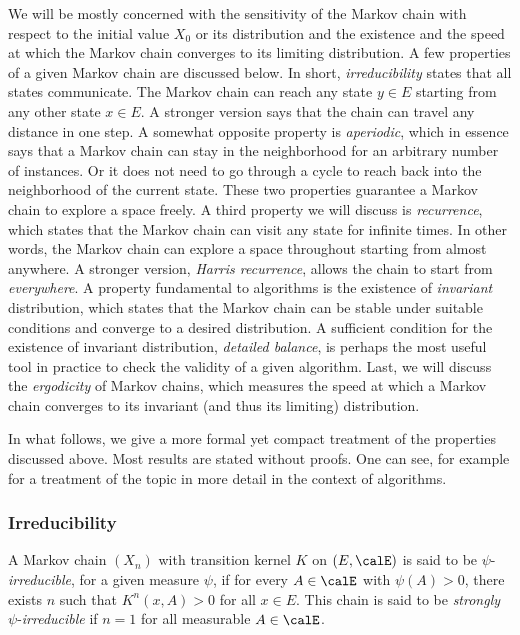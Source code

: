 We will be mostly concerned with the sensitivity of the Markov chain with
respect to the initial value $X_0$ or its distribution and the existence and
the speed at which the Markov chain converges to its limiting distribution. A
few properties of a given Markov chain are discussed below. In short,
\emph{irreducibility} states that all states communicate. The Markov chain can
reach any state $y\in E$ starting from any other state $x\in E$. A stronger
version says that the chain can travel any distance in one step. A somewhat
opposite property is \emph{aperiodic}, which in essence says that a Markov
chain can stay in the neighborhood for an arbitrary number of instances. Or it
does not need to go through a cycle to reach back into the neighborhood of the
current state. These two properties guarantee a Markov chain to explore a
space freely. A third property we will discuss is \emph{recurrence}, which
states that the Markov chain can visit any state for infinite times. In other
words, the Markov chain can explore a space throughout starting from almost
anywhere. A stronger version, \emph{Harris recurrence}, allows the chain to
start from \emph{everywhere}. A property fundamental to \mcmc algorithms is
the existence of \emph{invariant} distribution, which states that the Markov
chain can be stable under suitable conditions and converge to a desired
distribution. A sufficient condition for the existence of invariant
distribution, \emph{detailed balance}, is perhaps the most useful tool in
practice to check the validity of a given algorithm. Last, we will discuss the
\emph{ergodicity} of Markov chains, which measures the speed at which a Markov
chain converges to its invariant (and thus its limiting) distribution.

In what follows, we give a more formal yet compact treatment of the properties
discussed above. Most results are stated without proofs. One can see, for
example \cite[][chap.~6]{Robert:2004tn} for a treatment of the topic in more
detail in the context of \mcmc algorithms.

\subsubsection{Irreducibility}

A Markov chain $(X_n)$ with transition kernel $K$ on $(E,\calE)$ is said to be
$\psi$-\emph{irreducible}, for a given measure $\psi$, if for every
$A\in\calE$ with $\psi(A)>0$, there exists $n$ such that $K^n(x,A)>0$ for all
$x\in E$. This chain is said to be \emph{strongly} $\psi$-\emph{irreducible}
if $n=1$ for all measurable $A\in\calE$.

